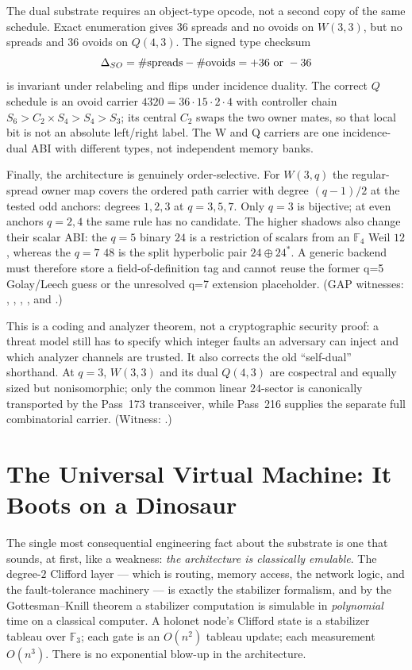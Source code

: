 \documentclass[11pt]{article}
\begin{document}
The dual substrate requires an object-type opcode, not a second copy of the
same schedule.  Exact enumeration gives $36$ spreads and no ovoids on
$W(3,3)$, but no spreads and $36$ ovoids on $Q(4,3)$.  The signed type
checksum
\[
 \Delta_{SO}=\#\mathrm{spreads}-\#\mathrm{ovoids}=+36\ \hbox{or}\ -36
\]
is invariant under relabeling and flips under incidence duality.  The
correct $Q$ schedule is an ovoid carrier
$4320=36\cdot15\cdot2\cdot4$ with controller chain
$S_6>C_2\times S_4>S_4>S_3$; its central $C_2$ swaps the two owner mates, so
that local bit is not an absolute left/right label.  The W and Q carriers
are one incidence-dual ABI with different types, not independent memory
banks.

Finally, the architecture is genuinely order-selective.  For $W(3,q)$ the
regular-spread owner map covers the ordered path carrier with degree
$(q-1)/2$ at the tested odd anchors: degrees $1,2,3$ at $q=3,5,7$.  Only
$q=3$ is bijective; at even anchors $q=2,4$ the same rule has no candidate.  The
higher shadows also change their scalar ABI: the $q=5$ binary $24$ is a
restriction of scalars from an $\mathbb F_4$ Weil $12$, whereas the $q=7$
$48$ is the split hyperbolic pair $24\oplus24^*$.  A generic backend must
therefore store a field-of-definition tag and cannot reuse the former q=5
Golay/Leech guess or the unresolved q=7 extension placeholder.  (GAP
witnesses:
,
,
,
, and
.)

This is a coding and analyzer theorem, not a cryptographic security proof: a threat model still has to
specify which integer faults an adversary can inject and which analyzer channels are trusted.  It also
corrects the old ``self-dual'' shorthand.  At $q=3$, $W(3,3)$ and its dual $Q(4,3)$ are cospectral and
equally sized but nonisomorphic; only the common linear $24$-sector is canonically transported by the
Pass~173 transceiver, while Pass~216 supplies the separate full combinatorial carrier.  (Witness:
.)

\section{The Universal Virtual Machine: It Boots on a Dinosaur}
\label{sec:vm}
The single most consequential engineering fact about the substrate is one that sounds, at first, like a
weakness: \emph{the architecture is classically emulable}. The degree-$2$ Clifford layer --- which is
routing, memory access, the network logic, and the fault-tolerance machinery --- is exactly the
stabilizer formalism, and by the Gottesman--Knill theorem a stabilizer computation is simulable in
\emph{polynomial} time on a classical computer. A holonet node's Clifford state is a stabilizer tableau
over $\mathbb{F}_3$; each gate is an $O(n^2)$ tableau update; each measurement $O(n^3)$. There is no
exponential blow-up in the architecture.
\end{document}
